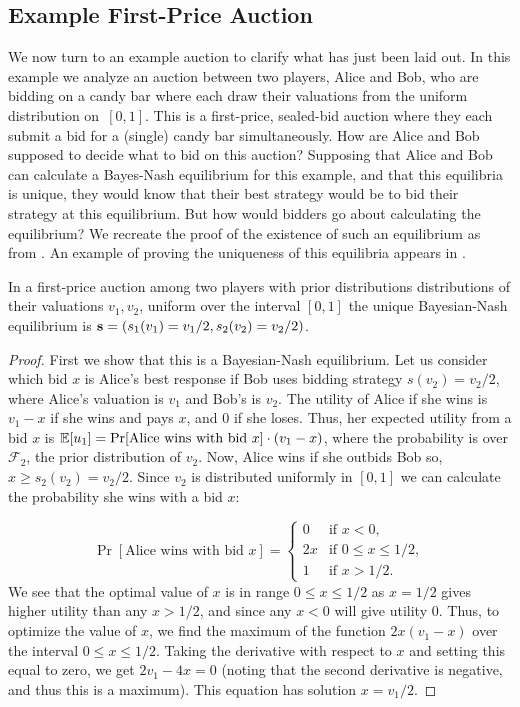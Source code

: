 \documentclass[12pt,twoside]{reedthesis}
\begin{document}
\subsection{Example First-Price Auction}
We now turn to an example auction to clarify what has just been laid out. In this example we analyze an auction between two players, Alice and Bob, who are bidding on a candy bar where each draw their valuations from the uniform distribution on~$[0,1]$. This is a first-price, sealed-bid auction where they each submit a bid for a (single) candy bar simultaneously. How are Alice and Bob supposed to decide what to bid on this auction? Supposing that Alice and Bob can calculate a Bayes-Nash equilibrium for this example, and that this equilibria is unique, they would know that their best strategy would be to bid their strategy at this equilibrium. But how would bidders go about calculating the equilibrium? We recreate the proof of the existence of such an equilibrium as from \cite{Nisan2007}. An example of proving the uniqueness of this equilibria appears in \cite{Levin2002}.

\begin{prop}
	In a first-price auction among two players with prior distributions distributions of their valuations $v_1,v_2$, uniform over the interval $[0,1]$ the unique Bayesian-Nash equilibrium is $\textbf{s} = (s_1(v_1) = v_1 / 2, s_2(v_2) = v_2 / 2)$.
\end{prop}

\begin{proof}{\citep{Nisan2007}}
	First we show that this is a Bayesian-Nash equilibrium. Let us consider which bid $x$ is Alice's best response if Bob uses bidding strategy $s(v_2) = v_2/2$, where Alice's valuation is $v_1$ and Bob's is $v_2$. The utility of Alice if she wins is $v_1 - x$ if she wins and pays $x$, and $0$ if she loses. Thus, her expected utility from a bid $x$ is $\mathbb{E}[u_1] = \Pr[\text{Alice wins with bid } x] \cdot (v_1 -x)$, where the probability is over $\mathcal{F}_2$, the prior distribution of $v_2$. Now, Alice wins if she outbids Bob so, $x \geq s_2(v_2) = v_2 / 2$. Since $v_2$ is distributed uniformly in $[0,1]$ we can calculate the probability she wins with a bid $x$: 
	
	\[
	\Pr[\text{Alice wins with bid } x] =
	\begin{cases}
	0 & \text{if } x < 0, \\
	2x & \text{if } 0 \leq x \leq 1/2,\\
	1 & \text{if } x > 1/2.
	\end{cases}
	\]
We see that the optimal value of $x$ is in range $0 \leq x \leq 1/2$ as $x = 1/2$ gives higher utility than any $x > 1/2$, and since any $x < 0$ will give utility $0$. Thus, to optimize the value of $x$, we find the maximum of the function $2x(v_1 - x)$ over the interval $0 \leq x \leq 1/2$. Taking the derivative with respect to $x$ and setting this equal to zero, we get $2v_1 - 4x = 0$ (noting that the second derivative is negative, and thus this is a maximum). This equation has solution $x = v_1/2$.
\end{proof}
\end{document}

